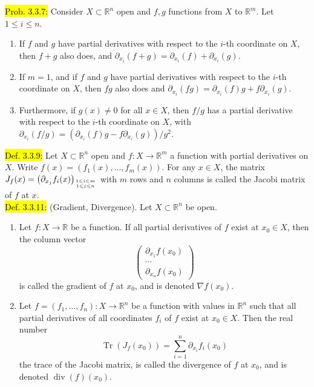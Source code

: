 \documentclass[10pt,landscape]{article}
\newcommand{\yellow}[1]{\sethlcolor{yellow} \hl{#1}}
\newcommand{\blue}[1]{\sethlcolor{cyan} \hl{#1}}
\begin{document}
\begin{multicols}{3}
\yellow{Prob. 3.3.7:} Consider $X \subset \mathbb{R}^{n}$ open and $f, g$ functions from $X$ to $\mathbb{R}^{m}$. Let $1 \leqslant i \leqslant n$.
\begin{enumerate}
        \item If $f$ and $g$ have partial derivatives with respect to the $i$-th coordinate on $X$, then $f+g$ also does, and
        $\partial_{x_{i}}(f+g)=\partial_{x_{i}}(f)+\partial_{x_{i}}(g)$.
        \item If $m=1$, and if $f$ and $g$ have partial derivatives with respect to the $i$-th coordinate on $X$, then $f g$ also does and
        $\partial_{x_{i}}(f g)=\partial_{x_{i}}(f) g+f \partial_{x_{i}}(g)$.
        \item Furthermore, if $g(x) \neq 0$ for all $x \in X$, then $f / g$ has a partial derivative with respect to the $i$-th coordinate on $X$, with
        $\partial_{x_{i}}(f / g)=\left(\partial_{x_{i}}(f) g-f \partial_{x_{i}}(g)\right) / g^{2}$.
\end{enumerate}
\blue{Def. 3.3.9:} Let $X \subset \mathbb{R}^{n}$ open and $f: X \rightarrow \mathbb{R}^{m}$ a function with partial derivatives on $X$. Write
$f(x)=\left(f_{1}(x), \ldots, f_{m}(x)\right)$. For any $x \in X$, 
the matrix $J_{f}(x)=\left(\partial_{x_{j}} f_{i}(x)\right)_{1 \leqslant i \leqslant m \atop 1 \leqslant j \leqslant n}$
with $m$ rows and $n$ columns is called the Jacobi matrix of $f$ at $x$.\\
\blue{Def. 3.3.11:} (Gradient, Divergence). Let $X \subset \mathbb{R}^{n}$ be open.
\begin{enumerate}
        \item Let $f: X \rightarrow \mathbb{R}$ be a function. If all partial derivatives of $f$ exist at $x_{0} \in X$, then the column vector
        $$
        \left(\begin{array}{c}
        \partial_{x_{1}} f\left(x_{0}\right) \\
        \cdots \\
        \partial_{x_{n}} f\left(x_{0}\right)
        \end{array}\right)
        $$
        is called the gradient of $f$ at $x_{0}$, and is denoted $\nabla f\left(x_{0}\right)$.
        \item Let $f=\left(f_{1}, \ldots, f_{n}\right): X \rightarrow \mathbb{R}^{n}$ be a function with values in $\mathbb{R}^{n}$ such that all partial derivatives of all coordinates $f_{i}$ of $f$ exist at $x_{0} \in X$. Then the real number
        $$
        \operatorname{Tr}\left(J_{f}\left(x_{0}\right)\right)=\sum_{i=1}^{n} \partial_{x_{i}} f_{i}\left(x_{0}\right)
        $$
        the trace of the Jacobi matrix, is called the divergence of $f$ at $x_{0}$, and is denoted $\operatorname{div}(f)\left(x_{0}\right)$.
\end{enumerate}

\end{multicols}
\end{document}
